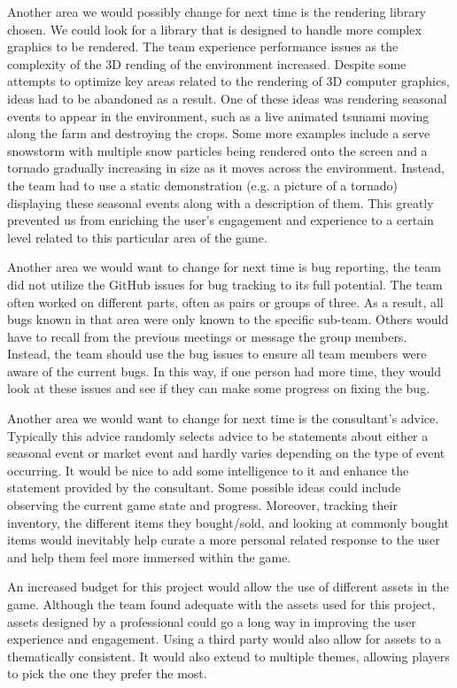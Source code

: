 \documentclass{article}
\begin{document}
 Another area we would possibly change for next time is the rendering library chosen. We could look for a library that is designed to handle more complex graphics to be rendered. The team experience performance issues as the complexity of the 3D rending of the environment increased. Despite some attempts to optimize key areas related to the rendering of 3D computer graphics, ideas had to be abandoned as a result. One of these ideas was rendering seasonal events to appear in the environment, such as a live animated tsunami moving along the farm and destroying the crops. Some more examples include a serve snowstorm with multiple snow particles being rendered onto the screen and a tornado gradually increasing in size as it moves across the environment. Instead, the team had to use a static demonstration (e.g. a picture of a tornado) displaying these seasonal events along with a description of them. This greatly prevented us from enriching the user's engagement and experience to a certain level related to this particular area of the game. 

 Another area we would want to change for next time is bug reporting, the team did not utilize the GitHub issues for bug tracking to its full potential. The team often worked on different parts, often as pairs or groups of three. As a result, all bugs known in that area were only known to the specific sub-team. Others would have to recall from the previous meetings or message the group members. Instead, the team should use the bug issues to ensure all team members were aware of the current bugs. In this way, if one person had more time, they would look at these issues and see if they can make some progress on fixing the bug. 


 Another area we would want to change for next time is the consultant's advice. Typically this advice randomly selects advice to be statements about either a seasonal event or market event and hardly varies depending on the type of event occurring. It would be nice to add some intelligence to it and enhance the statement provided by the consultant. Some possible ideas could include observing the current game state and progress. Moreover, tracking their inventory, the different items they bought/sold, and looking at commonly bought items would inevitably help curate a more personal related response to the user and help them feel more immersed within the game.   


 An increased budget for this project would allow the use of different assets in the game. Although the team found adequate with the assets used for this project, assets designed by a professional could go a long way in improving the user experience and engagement. Using a third party would also allow for assets to a thematically consistent. It would also extend to multiple themes, allowing players to pick the one they prefer the most.
\end{document}
